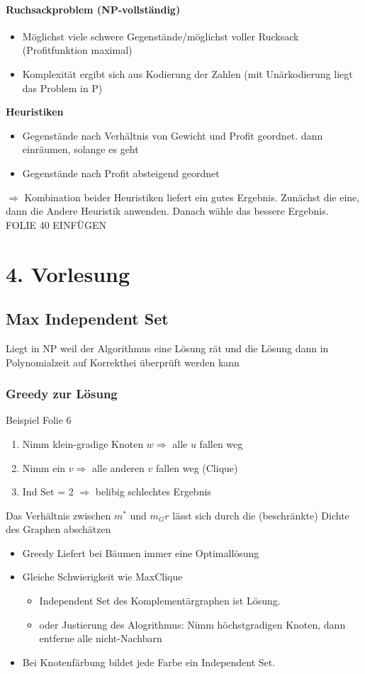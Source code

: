 \documentclass[ngerman]{scrartcl}
\begin{document}
\paragraph*{Ruchsackproblem (NP-vollständig)}
\begin{itemize}
  \item Möglichst viele schwere Gegenstände/möglichst voller Rucksack (Profitfunktion maximal)
  \item Komplexität ergibt sich aus Kodierung der Zahlen (mit Unärkodierung liegt das Problem in P)
\end{itemize}
\textbf{Heuristiken}
\begin{itemize}
  \item Gegenstände nach Verhältnis von Gewicht und Profit geordnet. dann einräumen, solange es geht
  \item Gegenstände nach Profit absteigend geordnet
\end{itemize} 
$ \Rightarrow $ Kombination beider Heuristiken liefert ein gutes Ergebnis. Zunächst die eine, dann die Andere Heuristik anwenden. Danach wähle das bessere Ergebnis.\\
FOLIE 40 EINFÜGEN

\section{4. Vorlesung}
\subsection{Max Independent Set}
Liegt in NP weil der Algorithmus eine Lösung rät und die Lösung dann in Polynomialzeit auf Korrekthei überprüft werden kann
\subsubsection*{Greedy zur Lösung}
Beispiel Folie 6
\begin{enumerate}
  \item Nimm klein-gradige Knoten $ w \Rightarrow$ alle $ u $ fallen weg
  \item Nimm ein $ v \Rightarrow$ alle anderen $ v $ fallen weg (Clique)
  \item Ind Set = 2  $ \Rightarrow $ belibig schlechtes Ergebnis
\end{enumerate}
Das Verhältnis zwischen $ m^* $ und $ m_Gr $ lässt sich durch die (beschränkte) Dichte des Graphen abschätzen

\begin{itemize}
  \item Greedy Liefert bei Bäumen immer eine Optimallösung 
  \item Gleiche Schwierigkeit wie MaxClique
  \begin{itemize}
    \item Independent Set des Komplementärgraphen ist Lösung. 
    \item oder Justierung des Alogrithmus: Nimm höchstgradigen Knoten, dann entferne alle nicht-Nachbarn
  \end{itemize}
  \item Bei Knotenfärbung bildet jede Farbe ein Independent Set. 
\end{itemize}
\end{document}
